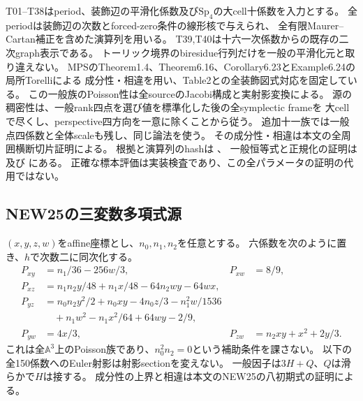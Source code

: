 T01--T38はperiod、装飾辺の平滑化係数及び$\mathrm{Sp}_4$の大cell十係数を入力とする。
全periodは装飾辺の次数とforced-zero条件の線形核で与えられ、
全有限Maurer--Cartan補正を含めた演算列を用いる。
T39,T40は十六一次係数からの既存の二次graph表示である。
トーリック境界のbiresidue行列だけを一般の平滑化元と取り違えない。
MPSのTheorem1.4、Theorem6.16、Corollary6.23とExample6.24の局所Torelliによる
成分性・相違を用い、Table2との全装飾図式対応を固定している\cite{mps}。
この一般族のPoisson性は全sourceのJacobi構成と実射影変換による。
源の稠密性は、一般rank四点を選び値を標準化した後の全symplectic frameを
大cellで尽くし、perspective四方向を一意に除くことから従う。
追加十一族では一般点四係数と全体scaleも残し、同じ論法を使う。
その成分性・相違は本文の全周囲横断切片証明による。
根拠と演算列のhashは
、
一般恒等式と正規化の証明は
及び
にある。
正確な標本評価は実装検査であり、この全パラメータの証明の代用ではない。

\subsection{NEW25の三変数多項式源}\label{source:new25}
$(x,y,z,w)$をaffine座標とし、$n_0,n_1,n_2$を任意とする。
六係数を次のように置き、$h$で次数二に同次化する。
\[
\begin{aligned}
 P_{xy}&=n_1/36-256w/3,&P_{xw}&=8/9,\\
 P_{xz}&=n_1n_2y/48+n_1x/48-64n_2wy-64wx,\\
 P_{yz}&=n_0n_2y^2/2+n_0xy-4n_0z/3-n_1^2w/1536\\
 &\quad+n_1w^2-n_1x^2/64+64wy-2/9,\\
 P_{yw}&=4x/3,&P_{zw}&=n_2xy+x^2+2y/3.
\end{aligned}
\]
これは全$\mathbb A^3$上のPoisson族であり、$n_0^2n_2=0$という補助条件を課さない。
以下の全150係数へのEuler射影は射影sectionを変えない。
一般因子は$3H+Q$、$Q$は滑らかで$H$は接する。
成分性の上界と相違は本文のNEW25の八初期式の証明による。

